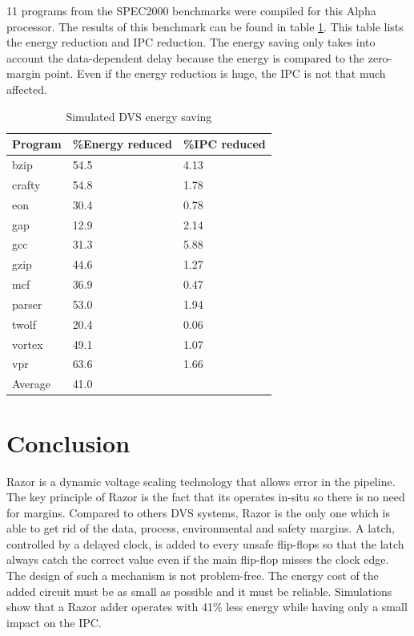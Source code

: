 \documentclass[fleqn,envcountsame,runningheads,10pt,a4paper]{llncs}
\begin{document}
11 programs from the SPEC2000 benchmarks were compiled for this Alpha processor. The results of this benchmark can be found in table \ref{table1}. This table lists the energy reduction and IPC reduction. The energy saving only takes into account the data-dependent delay because the energy is compared to the zero-margin point. Even if the energy reduction is huge, the IPC is not that much affected.
\begin{table}[t]
\centering
    \caption{\label{table1} Simulated DVS energy saving}
    \begin{tabular}{|l|l|l|}
        \hline
        Program & \%Energy reduced & \%IPC reduced \\ \hline
        bzip    & 54.5            & 4.13         \\ 
        crafty  & 54.8            & 1.78         \\ 
        eon     & 30.4            & 0.78         \\ 
        gap     & 12.9            & 2.14         \\ 
        gcc     & 31.3            & 5.88         \\ 
        gzip    & 44.6            & 1.27         \\ 
        mcf     & 36.9            & 0.47         \\ 
        parser  & 53.0            & 1.94         \\ 
        twolf   & 20.4            & 0.06         \\ 
        vortex  & 49.1            & 1.07         \\ 
        vpr     & 63.6            & 1.66         \\ 
        Average & 41.0            & ~            \\
        \hline
    \end{tabular}
\end{table}

\section{Conclusion}
Razor is a dynamic voltage scaling technology that allows error in the
pipeline. The key principle of Razor is the fact that its operates
in-situ so there is no need for margins. Compared to others DVS systems,
Razor is the only one which is able to get rid of the data, process,
environmental and safety margins. A latch, controlled by a delayed
clock, is added to every unsafe flip-flops so that the latch always
catch the correct value even if the main flip-flop misses the clock
edge. The design of such a mechanism is not problem-free. The energy
cost of the added circuit must be as small as possible and it must be
reliable. Simulations show that a Razor adder operates with 41\% less energy while having only a small impact on the IPC. 


\end{document}
